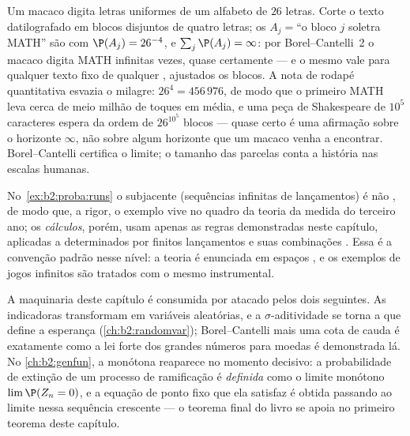 \begin{example}
Um macaco digita letras uniformes  de um alfabeto de
$26$ letras. Corte o texto datilografado em blocos disjuntos
de quatro letras; os  $A_j = {}$``o bloco $j$ soletra
MATH'' são  com $\P(A_j) = 26^{-4}$, e
$\sum_j\P(A_j) = \infty$: por Borel--Cantelli~2 o macaco
digita MATH infinitas vezes, quase certamente --- e o mesmo
vale para qualquer texto fixo de qualquer , ajustados os blocos.
A nota de rodapé quantitativa esvazia o milagre: $26^4 =
456\,976$, de modo que o primeiro MATH leva cerca de meio milhão
de toques em média, e uma peça de Shakespeare de $10^5$
caracteres espera da ordem de $26^{10^5}$ blocos --- quase certo
é uma afirmação sobre o horizonte $\infty$, não sobre algum
horizonte que um macaco venha a encontrar. Borel--Cantelli certifica o
limite; o tamanho das parcelas conta a história nas escalas humanas.
\end{example}

\begin{remark}
No~\cref{ex:b2:proba:runs} o  subjacente (sequências
infinitas de lançamentos) é não , de modo que, a rigor, o
exemplo vive no quadro da teoria da medida do terceiro ano; os
\emph{cálculos}, porém, usam apenas as regras demonstradas neste
capítulo, aplicadas a  determinados por finitos lançamentos e
suas combinações . Essa é a convenção padrão nesse nível:
a teoria é enunciada em espaços , e os exemplos de jogos
infinitos são tratados com o mesmo instrumental.
\end{remark}

\begin{remark}
A maquinaria deste capítulo é consumida por atacado pelos dois
seguintes. As indicadoras transformam  em variáveis aleatórias, e a
$\sigma$-aditividade se torna a  que define a
esperança (\cref{ch:b2:randomvar}); Borel--Cantelli mais uma cota
de cauda  é exatamente como a lei forte dos grandes
números para moedas é demonstrada lá. No
\cref{ch:b2:genfun}, a  monótona reaparece no
momento decisivo: a probabilidade de extinção de um processo de
ramificação é \emph{definida} como o limite monótono
$\lim\P(Z_n = 0)$, e a equação de ponto fixo que ela satisfaz
é obtida passando ao limite nessa sequência
crescente --- o teorema final do livro se apoia no primeiro
teorema deste capítulo.
\end{remark}

